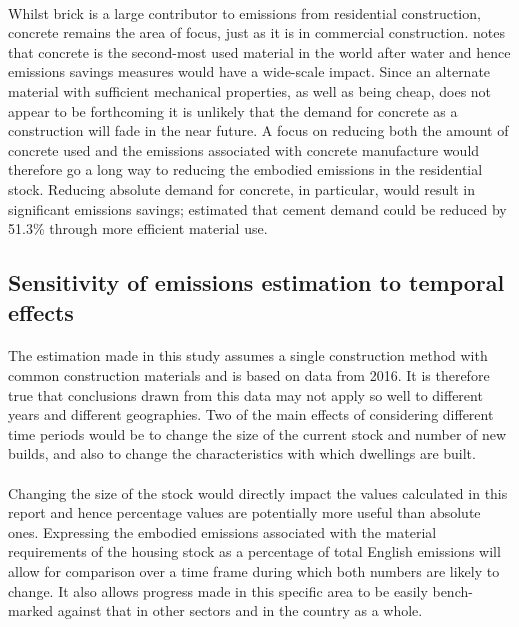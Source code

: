 \documentclass[12pt]{article}
\begin{document}
\paragraph{}
Whilst brick is a large contributor to emissions from residential construction, concrete remains the area of focus, just as it is in commercial construction. \citet{Gagg2014-nc} notes that concrete is the second-most used material in the world after water and hence emissions savings measures would have a wide-scale impact. Since an alternate material with sufficient mechanical properties, as well as being cheap, does not appear to be forthcoming it is unlikely that the demand for concrete as a construction will fade in the near future. A focus on reducing both the amount of concrete used and the emissions associated with concrete manufacture would therefore go a long way to reducing the embodied emissions in the residential stock. Reducing absolute demand for concrete, in particular, would result in significant emissions savings; \citet{Shanks2019-nu} estimated that cement demand could be reduced by 51.3\% through more efficient material use. 

\subsection{Sensitivity of emissions estimation to temporal effects}

\paragraph{}
The estimation made in this study assumes a single construction method with common construction materials and is based on data from 2016. It is therefore true that conclusions drawn from this data may not apply so well to different years and different geographies. Two of the main effects of considering different time periods would be to change the size of the current stock and number of new builds, and also to change the characteristics with which dwellings are built. 

\paragraph{}
Changing the size of the stock would directly impact the values calculated in this report and hence percentage values are potentially more useful than absolute ones. Expressing the embodied emissions associated with the material requirements of the housing stock as a percentage of total English emissions will allow for comparison over a time frame during which both numbers are likely to change. It also allows progress made in this specific area to be easily bench-marked against that in other sectors and in the country as a whole.
\end{document}
